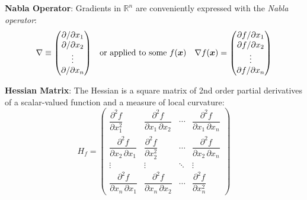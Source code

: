 \begin{frame}
    \begin{boxed}
        \small
        \textbf{Nabla Operator}:
        Gradients in $\mathbb{R}^n$ are conveniently expressed with the \emph{Nabla operator}:
        $$
            {\nabla \equiv \mqty(\partial / \partial x_1 \\ \partial / \partial x_2 \\ \vdots \\ \partial / \partial x_n)  }
            \quad \text{or applied to some $f(\v x)$} \quad
            {\nabla f(\v x) = \mqty(\partial f/ \partial x_1 \\ \partial f / \partial x_2 \\ \vdots \\ \partial f / \partial x_n)  }
        $$
    \end{boxed}
    \vspace*{-1mm}

    \begin{boxed}
        \small
        \textbf{Hessian Matrix}:
        The Hessian is a square matrix of 2nd order partial derivatives of a scalar-valued function and a measure of local curvature:
        $$
            H_f= \begin{pmatrix}
                \dfrac{\partial^2 f}{\partial x_1^2}             & \dfrac{\partial^2 f}{\partial x_1\,\partial x_2} & \cdots & \dfrac{\partial^2 f}{\partial x_1\,\partial x_n} \\[2.2ex]
                \dfrac{\partial^2 f}{\partial x_2\,\partial x_1} & \dfrac{\partial^2 f}{\partial x_2^2}             & \cdots & \dfrac{\partial^2 f}{\partial x_2\,\partial x_n} \\[2.2ex]
                \vdots                                           & \vdots                                           & \ddots & \vdots                                           \\[2.2ex]
                \dfrac{\partial^2 f}{\partial x_n\,\partial x_1} & \dfrac{\partial^2 f}{\partial x_n\,\partial x_2} & \cdots & \dfrac{\partial^2 f}{\partial x_n^2}
            \end{pmatrix}
        $$
    \end{boxed}

\end{frame}

